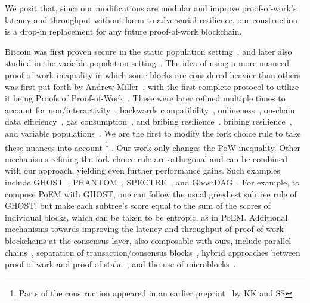 We posit that, since our modifications are modular and improve proof-of-work's latency and throughput without
harm to adversarial resilience, our construction is a drop-in replacement for any
future proof-of-work blockchain.

\noindent
{}
Bitcoin was first proven secure in the static population setting~\cite{backbone},
and later also studied in the variable population setting~\cite{varbackbone}.
The idea of using a more nuanced proof-of-work inequality in which some blocks
are considered heavier than others was first put forth by Andrew Miller~\cite{highway},
with the first complete protocol to utilize it being
Proofs of Proof-of-Work~\cite{popow}. These were later refined multiple times
to account for non\-/interactivity~\cite{nipopows}, backwards compatibility~\cite{velvet-nipopows},
onlineness~\cite{logspace}, on-chain data efficiency~\cite{compact-superblocks},
gas consumption~\cite{gasefficient-nipopows},
\ifanonymous%
and bribing resilience~\cite{soft-power}.
\else%
bribing resilience~\cite{soft-power},
and variable populations~\cite{dionyziz}.
\fi%
We are the first to modify the fork choice rule to take these nuances into
account%
\ifanonymous%
\else%
\footnote{Parts of the construction appeared in an earlier preprint~\cite{poem-short} by KK and SS}%
\fi%
.
Our work only changes the PoW inequality.
Other mechanisms refining the fork choice rule
are orthogonal and can be combined with our approach, yielding even
further performance gains.
Such examples include GHOST~\cite{ghost},
PHANTOM~\cite{phantom}, SPECTRE~\cite{spectre}, and GhostDAG~\cite{ghostdag}.
For example, to compose PoEM with GHOST, one can follow the usual greediest subtree rule of GHOST, but
make each subtree's score equal to the sum of the scores of individual blocks,
which can be taken to be entropic, as in PoEM.
Additional mechanisms towards improving the latency and throughput
of proof-of-work blockchains at the consensus
layer, also composable with ours, include parallel chains~\cite{parallel-chains},
separation of transaction/consensus blocks~\cite{prism},
hybrid approaches between proof-of-work and proof-of-stake~\cite{byzcoin},
and the use of microblocks~\cite{bitcoin-ng}.
